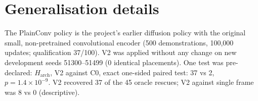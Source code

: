 \section{Generalisation details}\label{sec:s-gen}

The PlainConv policy is the project's earlier diffusion policy with the original small, non-pretrained convolutional encoder (500 demonstrations, 100,000 updates; qualification 37/100). V2 was applied without any change on new development seeds 51300--51499 (0 identical placements). One test was pre-declared: $H_{\mathrm{arch}}$, V2 against C0, exact one-sided paired test: 37 vs 2, $p=1.4\times10^{-9}$. V2 recovered 37 of the 45 oracle rescues; V2 against single frame was 8 vs 0 (descriptive).

